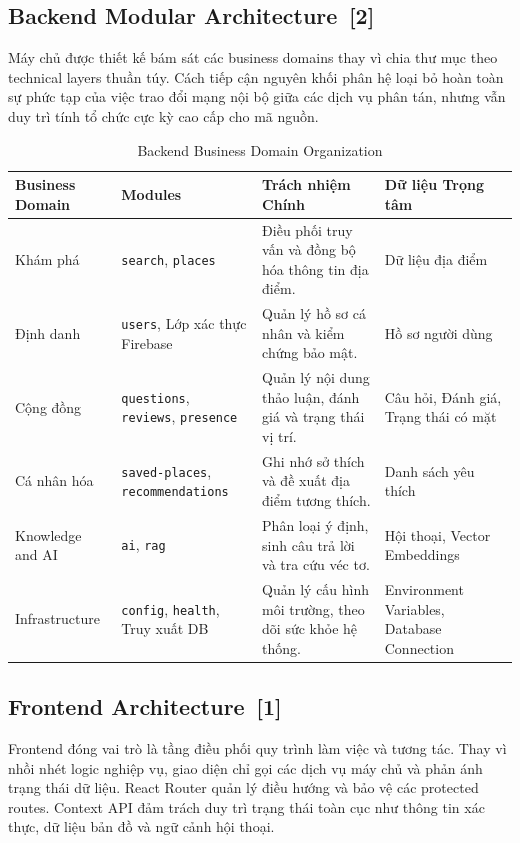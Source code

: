 \documentclass[12pt, a4paper]{article}
\begin{document}
\subsection[Backend Modular Architecture]{Backend Modular Architecture \,{\normalfont\small\textcolor{cyan!70!black}{[2]}}}

Máy chủ được thiết kế bám sát các business domains thay vì chia thư mục theo technical layers thuần túy. Cách tiếp cận nguyên khối phân hệ loại bỏ hoàn toàn sự phức tạp của việc trao đổi mạng nội bộ giữa các dịch vụ phân tán, nhưng vẫn duy trì tính tổ chức cực kỳ cao cấp cho mã nguồn.

\begin{table}[H]
    \centering
    \renewcommand{\arraystretch}{1.3}
    \begin{tabular}{|p{3cm}|p{3.5cm}|p{5cm}|p{3.5cm}|}
    \hline
    \textbf{Business Domain} & \textbf{Modules} & \textbf{Trách nhiệm Chính} & \textbf{Dữ liệu Trọng tâm} \\
    \hline
    Khám phá & \texttt{search}, \texttt{places} & Điều phối truy vấn và đồng bộ hóa thông tin địa điểm. & Dữ liệu địa điểm \\
    \hline
    Định danh & \texttt{users}, Lớp xác thực Firebase & Quản lý hồ sơ cá nhân và kiểm chứng bảo mật. & Hồ sơ người dùng \\
    \hline
    Cộng đồng & \texttt{questions}, \texttt{reviews}, \texttt{presence} & Quản lý nội dung thảo luận, đánh giá và trạng thái vị trí. & Câu hỏi, Đánh giá, Trạng thái có mặt \\
    \hline
    Cá nhân hóa & \texttt{saved-places}, \texttt{recommendations} & Ghi nhớ sở thích và đề xuất địa điểm tương thích. & Danh sách yêu thích \\
    \hline
    Knowledge and AI & \texttt{ai}, \texttt{rag} & Phân loại ý định, sinh câu trả lời và tra cứu véc tơ. & Hội thoại, Vector Embeddings \\
    \hline
    Infrastructure & \texttt{config}, \texttt{health}, Truy xuất DB & Quản lý cấu hình môi trường, theo dõi sức khỏe hệ thống. & Environment Variables, Database Connection \\
    \hline
    \end{tabular}
    \caption{Backend Business Domain Organization}
    \label{tab:backend_modules}
\end{table}

\subsection[Frontend Architecture]{Frontend Architecture \,{\normalfont\small\textcolor{cyan!70!black}{[1]}}}
Frontend đóng vai trò là tầng điều phối quy trình làm việc và tương tác. Thay vì nhồi nhét logic nghiệp vụ, giao diện chỉ gọi các dịch vụ máy chủ và phản ánh trạng thái dữ liệu. React Router quản lý điều hướng và bảo vệ các protected routes. Context API đảm trách duy trì trạng thái toàn cục như thông tin xác thực, dữ liệu bản đồ và ngữ cảnh hội thoại.
\end{document}
